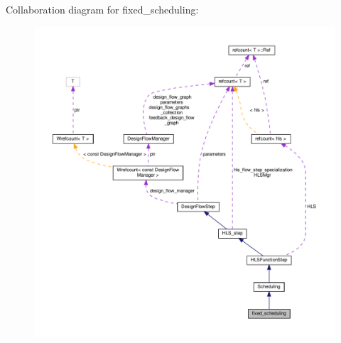 Collaboration diagram for fixed\+\_\+scheduling\+:
\nopagebreak
\begin{figure}[H]
\begin{center}
\leavevmode
\includegraphics[width=350pt]{dd/dd1/classfixed__scheduling__coll__graph}
\end{center}
\end{figure}
